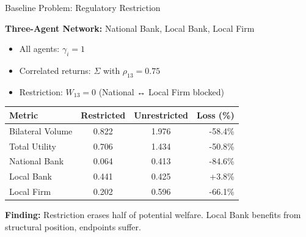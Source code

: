 \documentclass[aspectratio=169]{beamer}
\begin{document}
\begin{frame}{Baseline Problem: Regulatory Restriction}
    
    \textbf{Three-Agent Network:} National Bank, Local Bank, Local Firm
    \begin{itemize}
        \item All agents: $\gamma_i = 1$
        \item Correlated returns: $\Sigma$ with $\rho_{13} = 0.75$
        \item \textcolor{AlertRed}{Restriction: $W_{13} = 0$ (National ↔ Local Firm blocked)}
    \end{itemize}
    
    \vspace{0.3cm}
    \begin{table}
        \centering
        \small
        \begin{tabular}{lccr}
            \toprule
            \textbf{Metric} & \textbf{Restricted} & \textbf{Unrestricted} & \textbf{Loss (\%)} \\
            \midrule
            Bilateral Volume & 0.822 & 1.976 & -58.4\% \\
            Total Utility & 0.706 & 1.434 & \textcolor{AlertRed}{-50.8\%} \\
            \midrule
            National Bank & 0.064 & 0.413 & -84.6\% \\
            Local Bank & 0.441 & 0.425 & +3.8\% \\
            Local Firm & 0.202 & 0.596 & -66.1\% \\
            \bottomrule
        \end{tabular}
    \end{table}
    
    \vspace{0.2cm}
    \textbf{Finding:} Restriction erases half of potential welfare. Local Bank benefits from structural position, endpoints suffer.

\end{frame}
\end{document}
